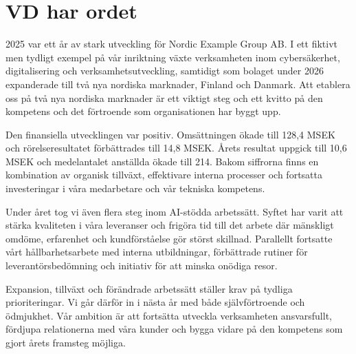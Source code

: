 \section{VD har ordet}

2025 var ett år av stark utveckling för Nordic Example Group AB. I ett fiktivt men tydligt exempel på vår inriktning växte verksamheten inom cybersäkerhet, digitalisering och verksamhetsutveckling, samtidigt som bolaget under 2026 expanderade till två nya nordiska marknader, Finland och Danmark. Att etablera oss på två nya nordiska marknader är ett viktigt steg och ett kvitto på den kompetens och det förtroende som organisationen har byggt upp.

Den finansiella utvecklingen var positiv. Omsättningen ökade till 128,4 MSEK och rörelseresultatet förbättrades till 14,8 MSEK. Årets resultat uppgick till 10,6 MSEK och medelantalet anställda ökade till 214. Bakom siffrorna finns en kombination av organisk tillväxt, effektivare interna processer och fortsatta investeringar i våra medarbetare och vår tekniska kompetens.

Under året tog vi även flera steg inom AI-stödda arbetssätt. Syftet har varit att stärka kvaliteten i våra leveranser och frigöra tid till det arbete där mänskligt omdöme, erfarenhet och kundförståelse gör störst skillnad. Parallellt fortsatte vårt hållbarhetsarbete med interna utbildningar, förbättrade rutiner för leverantörsbedömning och initiativ för att minska onödiga resor.

Expansion, tillväxt och förändrade arbetssätt ställer krav på tydliga prioriteringar. Vi går därför in i nästa år med både självförtroende och ödmjukhet. Vår ambition är att fortsätta utveckla verksamheten ansvarsfullt, fördjupa relationerna med våra kunder och bygga vidare på den kompetens som gjort årets framsteg möjliga.

